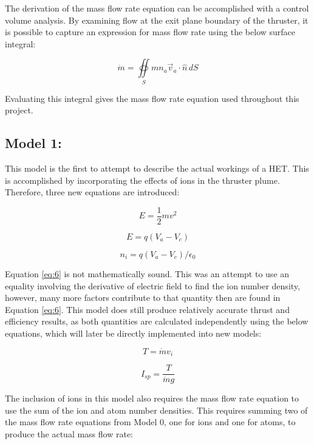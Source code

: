 \documentclass[letterpaper, 10 pt, conference]{ieeeconf}  %
\begin{document}
The derivation of the mass flow rate equation can be accomplished with a control volume analysis. By examining flow at the exit plane boundary of the thruster, it is possible to capture an expression for mass flow rate using the below surface integral:

\begin{equation} \label{eq:3}
\dot{m}=\oiint\limits_{S}mn_a\vec{v}_a \cdot \hat{n} \,dS
\end{equation}

Evaluating this integral gives the mass flow rate equation used throughout this project.

\subsection{Model 1:}
This model is the first to attempt to describe the actual workings of a HET. This is accomplished by incorporating the effects of ions in the thruster plume. Therefore, three new equations are introduced:

\begin{equation} \label{eq:4}
E = \frac{1}{2}mv^2
\end{equation}

\begin{equation} \label{eq:5}
E = q(V_a -V_c)
\end{equation}

\begin{equation} \label{eq:6}
n_i = q(V_a -V_c)/\epsilon_0
\end{equation}

Equation \ref{eq:6} is not mathematically sound. This was an attempt to use an equality involving the derivative of electric field to find the ion number density, however, many more factors contribute to that quantity then are found in Equation \ref{eq:6}. This model does still produce relatively accurate thrust and efficiency results, as both quantities are calculated independently using the below equations, which will later be directly implemented into new models:

\begin{equation} \label{eq:7}
T = \dot{m}v_i
\end{equation}

\begin{equation} \label{eq:8}
I_{sp} = \frac{T}{\dot{m}g}
\end{equation}

The inclusion of ions in this model also requires the mass flow rate equation to use the sum of the ion and atom number densities. This requires summing two of the mass flow rate equations from Model 0, one for ions and one for atoms, to produce the actual mass flow rate:
\end{document}
